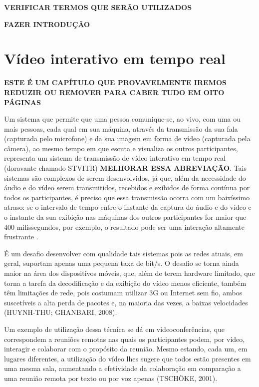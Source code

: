 \documentclass{acm_proc_article-sp}
\newcommand{\todo}[1]{\textcolor[rgb]{1.00,0.00,0.00}{\bf \uppercase{#1}}}
\begin{document}
\todo{verificar termos que serão utilizados}

\todo{fazer introdução}

\section{Vídeo interativo em tempo real}

\todo{este é um capítulo que provavelmente iremos reduzir ou remover para caber tudo em oito páginas}

Um sistema que permite que uma pessoa comunique-se, ao vivo, com uma ou mais
pessoas, cada qual em sua máquina, através da transmissão da sua fala (capturada pelo microfone) e da sua imagem em forma de vídeo (capturada pela câmera), ao mesmo tempo em que escuta e visualiza os outros participantes, representa um sistema de transmissão de vídeo interativo em tempo real (doravante chamado STVITR) \todo{melhorar essa abreviação}. Tais sistemas são complexos de serem desenvolvidos, já que, além da necessidade do áudio e do vídeo serem transmitidos, recebidos e exibidos de forma contínua por todos os participantes, é preciso que essa transmissão ocorra com um baixíssimo atraso: se o intervalo de tempo entre o instante da captura do áudio e do vídeo e o instante da sua exibição nas máquinas dos outros participantes for maior que 400 milissegundos, por exemplo, o resultado pode ser uma interação altamente frustrante \cite{kurose_1999}.

É um desafio desenvolver com qualidade tais sistemas pois as redes atuais, em geral, suportam apenas uma pequena taxa de bit/s. O desafio se torna ainda maior na área dos dispositivos móveis, que, além de terem hardware limitado, que torna a tarefa da decodificação e da exibição do vídeo menos eficiente, também têm limitações de rede, pois costumam utilizar 3G ou Internet sem fio, ambos suscetíveis a alta perda de pacotes e, na maioria das vezes, a baixas velocidades (HUYNH-THU; GHANBARI, 2008).

Um exemplo de utilização dessa técnica se dá em videoconferências, que correspondem a reuniões remotas nas quais os participantes podem, por vídeo, interagir e colaborar com o propósito da reunião. Mesmo estando, cada um, em lugares diferentes, a utilização do vídeo lhes sugere que todos estão presentes em uma mesma sala, aumentando a efetividade da colaboração em comparação a uma reunião remota por texto ou por voz apenas (TSCHÖKE, 2001).
\end{document}
